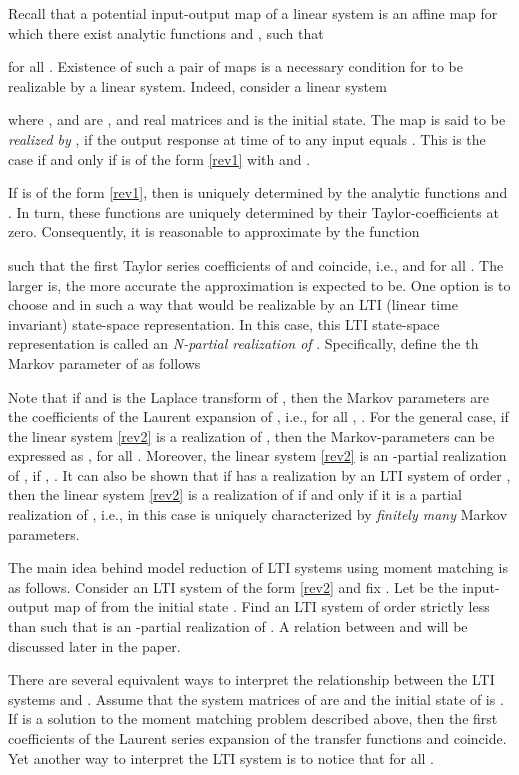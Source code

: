 \documentclass[journal]{IEEEtran}
\begin{document}
Recall that a potential input-output map of a linear system is an affine map  for which there exist analytic functions  and , such that

for all . Existence of such a pair of maps is a necessary condition for  to be realizable by a linear system. Indeed, consider a linear system

where ,  and  are ,  and  real matrices and  is the initial state. The map  is said to be \emph{realized by} , if the output response at time  of  to any input  equals . This is the case if and only if  is of the form \eqref{rev1} with  and .


If  is of the form \eqref{rev1}, then  is uniquely determined by the analytic functions  and . In turn, these functions are uniquely determined by their Taylor-coefficients at zero. Consequently, it is reasonable to approximate  by the function

such that the first  Taylor series coefficients of  and  coincide, i.e.,  and  for all .
The larger  is, the more accurate the approximation is expected to be. One option is to choose  and  in such a way that  would be realizable by an LTI (linear time invariant) state-space representation. In this case, this LTI state-space representation is called an \emph{N-partial realization of }. Specifically, define the th Markov parameter of  as follows

Note that if  and  is the Laplace transform of , then the Markov parameters are the coefficients of the Laurent expansion of , i.e.,  for all , . For the general case, if the linear system \eqref{rev2} is a realization of , then the Markov-parameters can be expressed as , for all . Moreover, the linear system \eqref{rev2} is an -partial realization of , if , . It can also be shown that if  has a realization by an LTI system of order , then the linear system \eqref{rev2} is a realization of  if and only if it is a  partial realization of , i.e., in this case  is uniquely characterized by \emph{finitely many} Markov parameters.

The main idea behind model reduction of LTI systems using moment matching is as follows. Consider an LTI system  of the form \eqref{rev2} and fix . Let  be the input-output map of  from the initial state . Find an LTI system  of order  strictly less than  such that  is an -partial realization of . A relation between  and  will be discussed later in the paper.

There are several equivalent ways to interpret the relationship between the LTI systems  and . Assume that the system matrices of  are  and the initial state of  is . If  is a solution to the moment matching problem described above, then the first  coefficients of the Laurent series expansion of the transfer functions  and  coincide. Yet another way to interpret the LTI system  is to notice that  for all .
\end{document}
